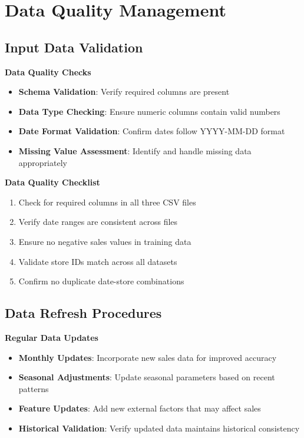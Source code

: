 \section{Data Quality Management}

\subsection{Input Data Validation}

\textbf{Data Quality Checks}
\begin{itemize}
	\item \textbf{Schema Validation}: Verify required columns are present
	\item \textbf{Data Type Checking}: Ensure numeric columns contain valid numbers
	\item \textbf{Date Format Validation}: Confirm dates follow YYYY-MM-DD format
	\item \textbf{Missing Value Assessment}: Identify and handle missing data appropriately
\end{itemize}

\textbf{Data Quality Checklist}
\begin{enumerate}
	\item Check for required columns in all three CSV files
	\item Verify date ranges are consistent across files
	\item Ensure no negative sales values in training data
	\item Validate store IDs match across all datasets
	\item Confirm no duplicate date-store combinations
\end{enumerate}


\subsection{Data Refresh Procedures}

\textbf{Regular Data Updates}
\begin{itemize}
	\item \textbf{Monthly Updates}: Incorporate new sales data for improved accuracy
	\item \textbf{Seasonal Adjustments}: Update seasonal parameters based on recent patterns
	\item \textbf{Feature Updates}: Add new external factors that may affect sales
	\item \textbf{Historical Validation}: Verify updated data maintains historical consistency
\end{itemize}

